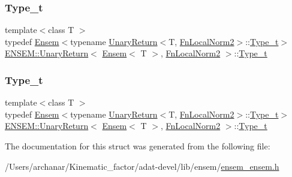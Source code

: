 \subsubsection{\texorpdfstring{Type\_t}{Type\_t}\hspace{0.1cm}{\footnotesize\ttfamily [2/3]}}
{\footnotesize\ttfamily template$<$class T $>$ \\
typedef \mbox{\hyperlink{classENSEM_1_1Ensem}{Ensem}}$<$typename \mbox{\hyperlink{structENSEM_1_1UnaryReturn}{Unary\+Return}}$<$T, \mbox{\hyperlink{structENSEM_1_1FnLocalNorm2}{Fn\+Local\+Norm2}}$>$\+::\mbox{\hyperlink{structENSEM_1_1UnaryReturn_3_01Ensem_3_01T_01_4_00_01FnLocalNorm2_01_4_a683bc7aab1651cd6ec3d3ccb81a0df5f}{Type\+\_\+t}}$>$ \mbox{\hyperlink{structENSEM_1_1UnaryReturn}{E\+N\+S\+E\+M\+::\+Unary\+Return}}$<$ \mbox{\hyperlink{classENSEM_1_1Ensem}{Ensem}}$<$ T $>$, \mbox{\hyperlink{structENSEM_1_1FnLocalNorm2}{Fn\+Local\+Norm2}} $>$\+::\mbox{\hyperlink{structENSEM_1_1UnaryReturn_3_01Ensem_3_01T_01_4_00_01FnLocalNorm2_01_4_a683bc7aab1651cd6ec3d3ccb81a0df5f}{Type\+\_\+t}}}

\mbox{\label{structENSEM_1_1UnaryReturn_3_01Ensem_3_01T_01_4_00_01FnLocalNorm2_01_4_a683bc7aab1651cd6ec3d3ccb81a0df5f}} 
\subsubsection{\texorpdfstring{Type\_t}{Type\_t}\hspace{0.1cm}{\footnotesize\ttfamily [3/3]}}
{\footnotesize\ttfamily template$<$class T $>$ \\
typedef \mbox{\hyperlink{classENSEM_1_1Ensem}{Ensem}}$<$typename \mbox{\hyperlink{structENSEM_1_1UnaryReturn}{Unary\+Return}}$<$T, \mbox{\hyperlink{structENSEM_1_1FnLocalNorm2}{Fn\+Local\+Norm2}}$>$\+::\mbox{\hyperlink{structENSEM_1_1UnaryReturn_3_01Ensem_3_01T_01_4_00_01FnLocalNorm2_01_4_a683bc7aab1651cd6ec3d3ccb81a0df5f}{Type\+\_\+t}}$>$ \mbox{\hyperlink{structENSEM_1_1UnaryReturn}{E\+N\+S\+E\+M\+::\+Unary\+Return}}$<$ \mbox{\hyperlink{classENSEM_1_1Ensem}{Ensem}}$<$ T $>$, \mbox{\hyperlink{structENSEM_1_1FnLocalNorm2}{Fn\+Local\+Norm2}} $>$\+::\mbox{\hyperlink{structENSEM_1_1UnaryReturn_3_01Ensem_3_01T_01_4_00_01FnLocalNorm2_01_4_a683bc7aab1651cd6ec3d3ccb81a0df5f}{Type\+\_\+t}}}



The documentation for this struct was generated from the following file\+:\begin{DoxyCompactItemize}
\item 
/\+Users/archanar/\+Kinematic\+\_\+factor/adat-\/devel/lib/ensem/\mbox{\hyperlink{adat-devel_2lib_2ensem_2ensem__ensem_8h}{ensem\+\_\+ensem.\+h}}\end{DoxyCompactItemize}
